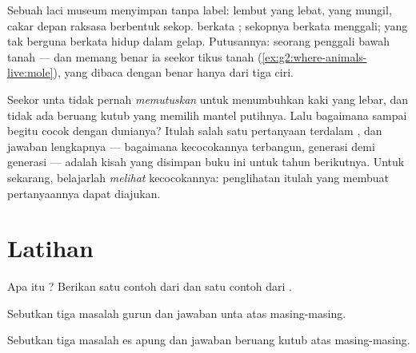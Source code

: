 \begin{example}\label{ex:g4:adapted-to-their-world:mystery}
Sebuah laci museum menyimpan  tanpa label:  lembut yang
lebat,  yang mungil, cakar depan raksasa berbentuk sekop. 
berkata ; sekopnya berkata menggali;  yang tak berguna
berkata hidup dalam gelap. Putusannya: seorang penggali bawah tanah
--- dan memang benar ia seekor tikus tanah
(\cref{ex:g2:where-animals-live:mole}), yang dibaca dengan benar hanya
dari tiga ciri.
\end{example}

\begin{remark}\label{rem:g4:adapted-to-their-world:how}
Seekor unta tidak pernah \emph{memutuskan} untuk menumbuhkan kaki yang
lebar, dan tidak ada beruang kutub yang memilih mantel putihnya. Lalu
bagaimana  sampai begitu cocok dengan dunianya? Itulah
salah satu pertanyaan terdalam , dan jawaban lengkapnya ---
bagaimana kecocokannya terbangun, generasi demi generasi --- adalah
kisah yang disimpan buku ini untuk tahun berikutnya. Untuk sekarang,
belajarlah \emph{melihat} kecocokannya: penglihatan itulah yang membuat
pertanyaannya dapat diajukan.
\end{remark}

\section{Latihan}

\begin{exercise}[$\star$]\label{exo:g4:adapted-to-their-world:1}
Apa itu ? Berikan satu contoh dari  dan satu contoh dari
.
\end{exercise}

\begin{exercise}[$\star$]\label{exo:g4:adapted-to-their-world:2}
Sebutkan tiga masalah gurun dan jawaban unta atas masing-masing.
\end{exercise}

\begin{exercise}[$\star$]\label{exo:g4:adapted-to-their-world:3}
Sebutkan tiga masalah es apung dan jawaban beruang kutub atas
masing-masing.
\end{exercise}

